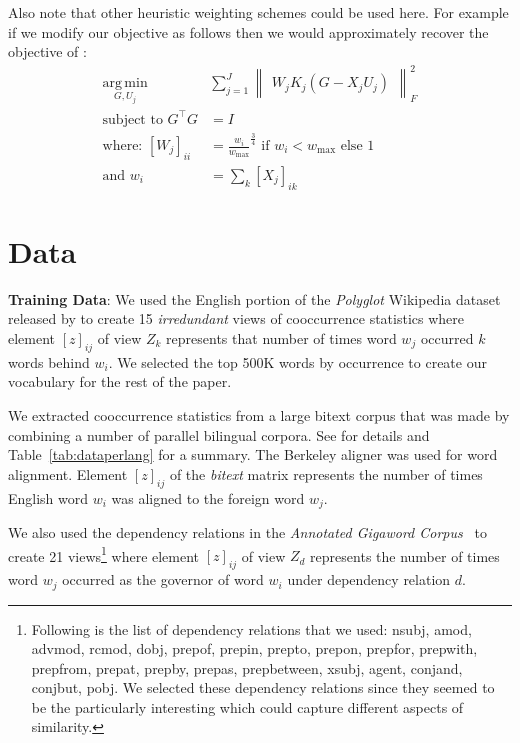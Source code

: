 \documentclass[11pt]{article}
\newcommand{\xline}[0]{\noindent\underline{\makebox[0.1cm][l]{}}}
\newcommand{\remove}[1]{}
\begin{document}
Also note that other heuristic weighting schemes could be used
here. For example if we modify our objective as follows then we would
approximately recover the objective of \cite{pennington2014glove}:
\begin{equation}
  \label{eq:gcca3}
\begin{split}
  \operatorname*{arg\,min}_{G,U_j} & \sum_{j=1}^J \begin{Vmatrix} W_j K_j(G - X_jU_j) \end{Vmatrix}^2_F \\
  \text{subject to } G^\top G &= I \\
  \text{where: } [W_j]_{ii} &= \frac{w_i}{w_{\max}}^{\frac{3}{4}} \text{ if } w_i <
  w_{\max} \text{ else } 1 \\
  \text{and } w_i &=  \sum_k [X_j]_{ik}
\end{split}
\end{equation}


\section{Data}
\label{sec:data}
\noindent\textbf{Training Data}: We used the English portion of the \textit{Polyglot} Wikipedia dataset
released by  to create 15 \emph{irredundant} views of
cooccurrence statistics where element $[z]_{ij}$ of view $Z_k$
represents that number of times word $w_j$ occurred $k$ words behind
$w_i$. \remove{We lowercased all the words and discarded all
words which were longer than 5 characters and contained more than 3 non
alphabetical symbols. This was done to preserves years and smaller
numbers.}
We selected the top 500K words by occurrence to 
create our vocabulary for the rest of the paper.

We extracted cooccurrence statistics from a large bitext corpus that was made by combining a
number of parallel bilingual corpora. See \cite{ganitkevitch2013ppdb} for details and
Table~\ref{tab:dataperlang} for a summary. The Berkeley aligner was used for word alignment. Element
$[z]_{ij}$ of the \textit{bitext} matrix represents the number of times English
word $w_i$ was aligned to the foreign word $w_j$.

We also used the dependency relations in the \textit{Annotated
  Gigaword Corpus}~\cite{annotatedGigaword12} to create 21
views\footnote{Following is the list of dependency relations that we
  used: nsubj, amod, advmod, rcmod, dobj, prep\xline{}of,
  prep\xline{}in, prep\xline{}to, prep\xline{}on, prep\xline{}for,
  prep\xline{}with, prep\xline{}from, prep\xline{}at, prep\xline{}by,
  prep\xline{}as, prep\xline{}between, xsubj, agent, conj\xline{}and,
  conj\xline{}but, pobj. We selected these dependency relations since
  they seemed to be the particularly interesting which could capture
  different aspects of similarity.}  where element $[z]_{ij}$ of view
$Z_d$ represents the number of times word $w_j$ occurred
as the governor of word $w_i$ under dependency relation $d$.
\end{document}
